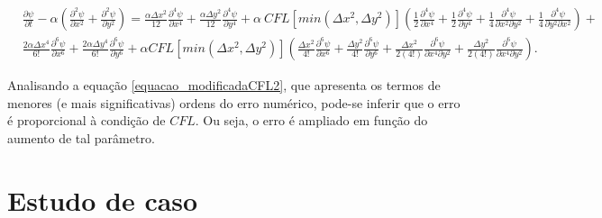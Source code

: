 \documentclass[10pt,twoside,a4paper]{article}
\begin{document}
	\begin{equation} \label{equacao_modificadaCFL2}
	\begin{split}
	&\frac{\partial \psi}{\partial t} - \alpha \left(\frac{\partial^{2} \psi}{\partial x^{2}} + \frac{\partial^{2} \psi}{\partial y^{2}} \right) = \frac{\alpha \Delta x^{2}}{12} \frac{\partial^{4} \psi}{\partial x^{4}} + \frac{\alpha \Delta y^{2}}{12} \frac{\partial^{4} \psi}{\partial y^{4}} + \alpha \ CFL \left[min(\Delta x^{2}, \Delta y^{2})\right] \left(\frac{1}{2} \frac{\partial^{4} \psi}{\partial x^{4}} + \frac{1}{2} \frac{\partial^{4} \psi}{\partial y^{4}} + \frac{1}{4}\frac{\partial^{4} \psi}{\partial x^{2} \partial y^{2}} + \frac{1}{4} \frac{\partial^{4} \psi}{\partial y^{2} \partial x^{2}} \right) + \\ &\frac{2 \alpha \Delta x^{4}}{6!} \frac{\partial^{6} \psi}{\partial x^{6}} + \frac{2 \alpha \Delta y^{4}}{6!} \frac{\partial^{6} \psi}{\partial y^{6}} + \alpha CFL \left[min(\Delta x^{2}, \Delta y^{2})\right]  \left(\frac{\Delta x^{2}}{4!} \frac{\partial^{6} \psi}{\partial x^{6}} + \frac{\Delta y^{2}}{4!} \frac{\partial^{6} \psi}{\partial y^{6}} + \frac{\Delta x^{2}}{2(4!)} \frac{\partial^{6} \psi}{\partial x^{4} \partial y^{2}} + \frac{\Delta y^{2}}{2(4!)} \frac{\partial^{6} \psi}{\partial x^{4} \partial y^{2}}\right).
	\end{split}
	\end{equation}
	
	Analisando a equação \ref{equacao_modificadaCFL2}, que apresenta os termos de menores (e mais significativas) ordens do erro numérico, pode-se inferir que o erro é proporcional à condição de $CFL$. Ou seja, o erro é ampliado em função do aumento de tal parâmetro.
	
	
	\section{Estudo de caso} %
	
\end{document}
